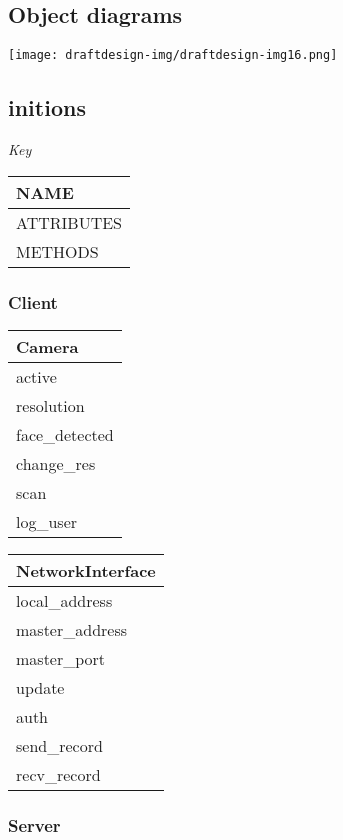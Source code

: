 \documentclass[12pt,a4paper]{report}
\begin{document}
\subsection[Object diagrams]{Object diagrams}
 \texttt{[image: draftdesign-img/draftdesign-img16.png]} 

\subsection[initions]{initions}

\textit{Key}


\begin{tabular}{|l|}
\hline
NAME\\\hline
ATTRIBUTES\\\hline
METHODS\\\hline
\end{tabular}

\subsubsection[Client]{Client}

\begin{tabular}{|l|}
\hline
\textbf{Camera}\\\hline
active\\
resolution\\
face\_detected\\\hline
change\_res\\
scan\\
log\_user\\\hline
\end{tabular}
\begin{tabular}{|l|}
\hline
\textbf{NetworkInterface}\\\hline
local\_address\\
master\_address\\
master\_port\\\hline
update\\
auth\\
send\_record\\
recv\_record\\\hline
\end{tabular}

\subsubsection[Server]{Server}
\end{document}
